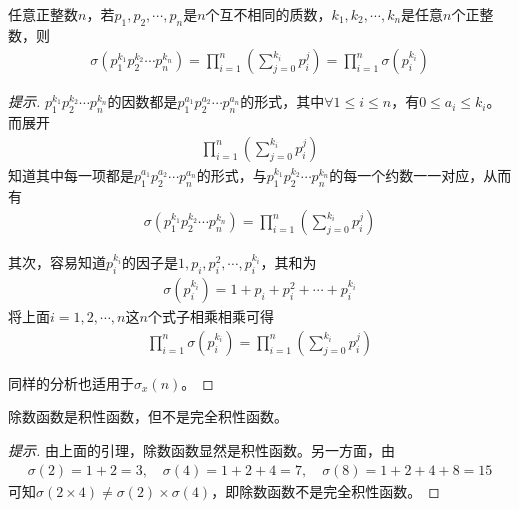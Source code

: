 \begin{lemma}\label{lem:sigma(a^k1*b^k2)=sigma(a^k1)sigma(b^k2)}
  任意正整数$n$，若$p_1,p_2,\cdots,p_n$是$n$个互不相同的质数，$k_1, k_2,\cdots,k_n$是任意$n$个正整数，则
  \begin{align*}
    \sigma\left(p_1^{k_1} p_2^{k_2} \cdots p_n^{k_n}\right) = \prod_{i=1}^n \left(\sum_{j=0}^{k_i} p_i^j\right) 
    = \prod_{i=1}^n \sigma\left(p_i^{k_i}\right)
  \end{align*}
\end{lemma}
\begin{proof}[提示]
  $p_1^{k_1} p_2^{k_2}\cdots p_n^{k_n}$的因数都是$p_1^{a_1} p_2^{a_2}\cdots p_n^{a_n}$的形式，其中$\forall 1\le i\le n$，有$0\le a_i\le k_i$。而展开
  \begin{align*}
    \prod_{i=1}^n \left(\sum_{j=0}^{k_i} p_i^j\right)
  \end{align*}
  知道其中每一项都是$p_1^{a_1} p_2^{a_2}\cdots p_n^{a_n}$的形式，与$p_1^{k_1} p_2^{k_2}\cdots p_n^{k_n}$的每一个约数一一对应，从而有
  \begin{align*}
    \sigma\left(p_1^{k_1} p_2^{k_2} \cdots p_n^{k_n}\right) = \prod_{i=1}^n \left(\sum_{j=0}^{k_i} p_i^j\right) 
  \end{align*}


  其次，容易知道$p_i^{k_i}$的因子是$1,p_i, p_i^2,\cdots, p_i^{k_i}$，其和为
  \begin{align*}
    \sigma\left(p_i^{k_i}\right) = 1 + p_i + p_i^2 + \cdots + p_i^{k_i}
  \end{align*}
  将上面$i=1,2,\cdots,n$这$n$个式子相乘相乘可得
  \begin{align*}
    \prod_{i=1}^n \sigma\left(p_i^{k_i}\right) = \prod_{i=1}^n \left(\sum_{j=0}^{k_i} p_i^j\right)
  \end{align*}

  同样的分析也适用于$\sigma_x(n)$。
\end{proof}

\begin{theorem}
  除数函数是积性函数，但不是完全积性函数。
\end{theorem}
\begin{proof}[提示]
  由上面的引理，除数函数显然是积性函数。另一方面，由
  \begin{align*}
    \sigma(2) = 1 + 2 = 3, \quad \sigma(4) = 1 + 2 + 4 = 7, \quad \sigma(8) = 1 + 2 + 4 + 8 = 15
  \end{align*}
  可知$\sigma(2\times 4) \ne \sigma(2) \times \sigma(4)$，即除数函数不是完全积性函数。
\end{proof}

